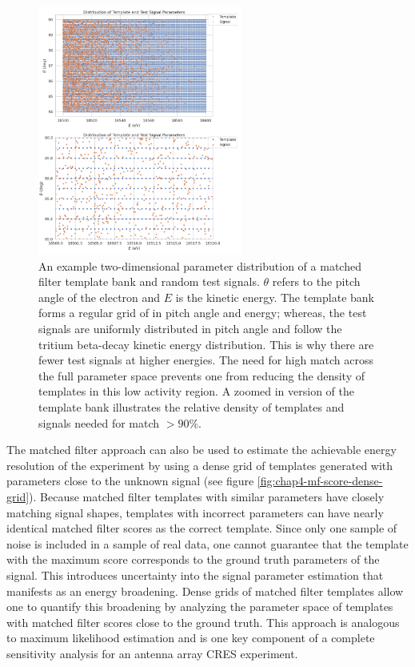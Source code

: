 \begin{figure}[htbp]
    \centering
    \includegraphics*[width=0.6\textwidth]{figs/Chapter-4/230725_matched_filter_grid_example.png}
    \caption{\label{fig:chap4-mf-parameter-grid} An example two-dimensional parameter distribution of a matched filter template bank and random test signals. $\theta$ refers to the pitch angle of the electron and $E$ is the kinetic energy. The template bank forms a regular grid of in pitch angle and energy; whereas, the test signals are uniformly distributed in pitch angle and follow the tritium beta-decay kinetic energy distribution. This is why there are fewer test signals at higher energies. The need for high match across the full parameter space prevents one from reducing the density of templates in this low activity region. A zoomed in version of the template bank illustrates the relative density of templates and signals needed for match $>90\%$. }
\end{figure}

The matched filter approach can also be used to estimate the achievable energy resolution of the experiment by using a dense grid of templates generated with parameters close to the unknown signal (see figure \ref{fig:chap4-mf-score-dense-grid}). Because matched filter templates with similar parameters have closely matching signal shapes, templates with incorrect parameters can have nearly identical matched filter scores as the correct template. Since only one sample of noise is included in a sample of real data, one cannot guarantee that the template with the maximum score corresponds to the ground truth parameters of the signal. This introduces uncertainty into the signal parameter estimation that manifests as an energy broadening. Dense grids of matched filter templates allow one to quantify this broadening by analyzing the parameter space of templates with matched filter scores close to the ground truth. This approach is analogous to maximum likelihood estimation and is one key component of a complete sensitivity analysis for an antenna array CRES experiment.

